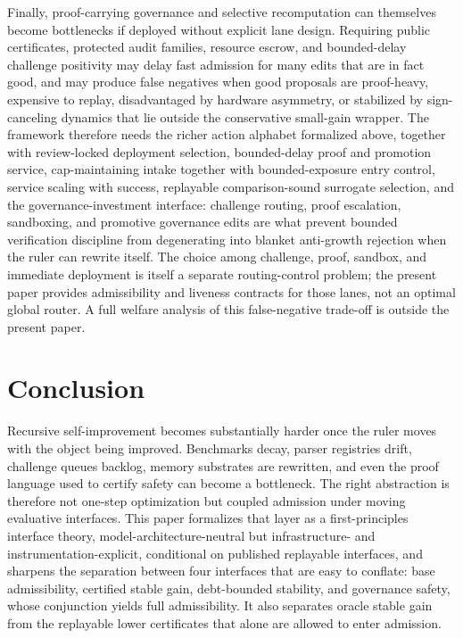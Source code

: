 \documentclass[11pt]{article}
\theoremstyle{definition}
\newcommand{\1}{\mathbf{1}}
\begin{document}
Finally, proof-carrying governance and selective recomputation can themselves become bottlenecks if deployed without explicit lane design. Requiring public certificates, protected audit families, resource escrow, and bounded-delay challenge positivity may delay fast admission for many edits that are in fact good, and may produce false negatives when good proposals are proof-heavy, expensive to replay, disadvantaged by hardware asymmetry, or stabilized by sign-canceling dynamics that lie outside the conservative small-gain wrapper. The framework therefore needs the richer action alphabet formalized above, together with review-locked deployment selection, bounded-delay proof and promotion service, cap-maintaining intake together with bounded-exposure entry control, service scaling with success, replayable comparison-sound surrogate selection, and the governance-investment interface: challenge routing, proof escalation, sandboxing, and promotive governance edits are what prevent bounded verification discipline from degenerating into blanket anti-growth rejection when the ruler can rewrite itself. The choice among challenge, proof, sandbox, and immediate deployment is itself a separate routing-control problem; the present paper provides admissibility and liveness contracts for those lanes, not an optimal global router. A full welfare analysis of this false-negative trade-off is outside the present paper.

\section{Conclusion}
Recursive self-improvement becomes substantially harder once the ruler moves with the object being improved. Benchmarks decay, parser registries drift, challenge queues backlog, memory substrates are rewritten, and even the proof language used to certify safety can become a bottleneck. The right abstraction is therefore not one-step optimization but coupled admission under moving evaluative interfaces. This paper formalizes that layer as a first-principles interface theory, model-architecture-neutral but infrastructure- and instrumentation-explicit, conditional on published replayable interfaces, and sharpens the separation between four interfaces that are easy to conflate: base admissibility, certified stable gain, debt-bounded stability, and governance safety, whose conjunction yields full admissibility. It also separates oracle stable gain from the replayable lower certificates that alone are allowed to enter admission.
\end{document}
